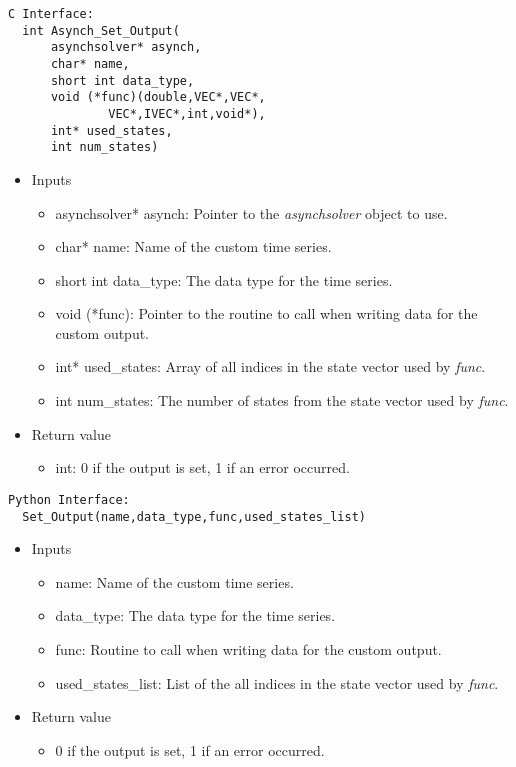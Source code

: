 \documentclass[12pt]{article}
\begin{document}
\begin{lstlisting}[style=CStyle]
  C Interface:
  int Asynch_Set_Output(
      asynchsolver* asynch,
      char* name,
      short int data_type,
      void (*func)(double,VEC*,VEC*,
		      VEC*,IVEC*,int,void*),
      int* used_states,
      int num_states)
\end{lstlisting}
\begin{itemize}
 \item Inputs
  \begin{itemize}
   \item asynchsolver* asynch: Pointer to the \emph{asynchsolver} object to use.
   \item char* name: Name of the custom time series.
   \item short int data\_type: The data type for the time series.
   \item void (*func): Pointer to the routine to call when writing data for the custom output.
   \item int* used\_states: Array of all indices in the state vector used by \emph{func}.
   \item int num\_states: The number of states from the state vector used by \emph{func}.
  \end{itemize}
 \item Return value
  \begin{itemize}
   \item int: 0 if the output is set, 1 if an error occurred.
  \end{itemize}
\end{itemize}
\begin{lstlisting}[style=PythonStyle]
  Python Interface:
  Set_Output(name,data_type,func,used_states_list)
\end{lstlisting}
\begin{itemize}
 \item Inputs
  \begin{itemize}
   \item name: Name of the custom time series.
   \item data\_type: The data type for the time series.
   \item func: Routine to call when writing data for the custom output.
   \item used\_states\_list: List of the all indices in the state vector used by \emph{func}.
  \end{itemize}
 \item Return value
  \begin{itemize}
   \item 0 if the output is set, 1 if an error occurred.
  \end{itemize}
\end{itemize}
\end{document}
